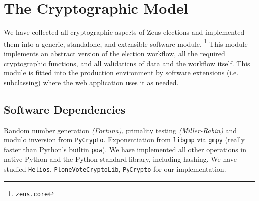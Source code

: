 \documentclass[letterpaper,twocolumn,10pt]{article}
\begin{document}

\section{The Cryptographic Model}

We have collected all cryptographic aspects of Zeus elections and
implemented them into a generic, standalone, and extensible software
module. \footnote{\texttt{zeus.core}} This module implements an
abstract version of the election workflow, all the required
cryptographic functions, and all validations of data and the workflow
itself. This module is fitted into the production environment by
software extensions (i.e. subclassing) where the web application uses
it as needed.

\subsection{Software Dependencies}
Random number generation \emph{(Fortuna)}, primality testing
\emph{(Miller-Rabin)} and modulo inversion from \texttt{PyCrypto}.
Exponentiation from \texttt{libgmp} via \texttt{gmpy} (really faster
than Python's builtin \texttt{pow}). We have implemented all other
operations in native Python and the Python standard library, including
hashing. We have studied \texttt{Helios}, \texttt{PloneVoteCryptoLib},
\texttt{PyCrypto} for our implementation.

\end{document}
